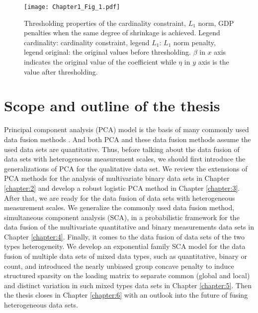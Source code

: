 \begin{figure}[htbp]
    \centering
    \texttt{[image: Chapter1\_Fig\_1.pdf]}
    \caption{Thresholding properties of the cardinality constraint, $L_{1}$ norm, GDP penalties when the same degree of shrinkage is achieved. Legend cardinality: cardinality constraint, legend $L_{1}$: $L_{1}$ norm penalty, legend original: the original values before thresholding. $\beta$ in $x$ axis indicates the original value of the coefficient while $\eta$ in $y$ axis is the value after thresholding.}
    \label{chapter1_fig:1}
\end{figure}

\section{Scope and outline of the thesis}
Principal component analysis (PCA) model is the basis of many commonly used data fusion methods \cite{maage2019performance}. And both PCA and these data fusion methods assume the used data sets are quantitative. Thus, before talking about the data fusion of data sets with heterogeneous measurement scales, we should first introduce the generalizations of PCA for the qualitative data set. We review the extensions of PCA methods for the analysis of multivariate binary data sets in Chapter \ref{chapter:2} and develop a robust logistic PCA method in Chapter \ref{chapter:3}. After that, we are ready for the data fusion of data sets with heterogeneous measurement scales. We generalize the commonly used data fusion method, simultaneous component analysis (SCA), in a probabilistic framework for the data fusion of the multivariate quantitative and binary measurements data sets in Chapter \ref{chapter:4}. Finally, it comes to the data fusion of data sets of the two types heterogeneity. We develop an exponential family SCA model for the data fusion of multiple data sets of mixed data types, such as quantitative, binary or count, and introduced the nearly unbiased group concave penalty to induce structured sparsity on the loading matrix to separate common (global and local) and distinct variation in such mixed types data sets in Chapter \ref{chapter:5}. Then the thesis closes in Chapter \ref{chapter:6} with an outlook into the future of fusing heterogeneous data sets. 